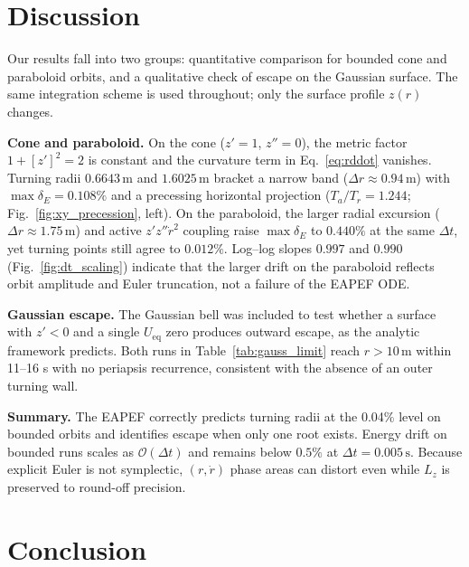 \documentclass[11pt,letterpaper]{article}
\newcommand{\parhead}[1]{\par\medskip\noindent\textbf{#1}\ignorespaces}
\begin{document}
\section{Discussion}
\label{sec:discussion}

Our results fall into two groups: quantitative comparison for bounded cone and paraboloid orbits, and a qualitative check of escape on the Gaussian surface. The same integration scheme is used throughout; only the surface profile $z(r)$ changes.

\parhead{Cone and paraboloid.}
On the cone ($z'=1$, $z''=0$), the metric factor $1+[z']^2=2$ is constant and the curvature term in Eq.~\eqref{eq:rddot} vanishes. Turning radii $0.6643\,\mathrm{m}$ and $1.6025\,\mathrm{m}$ bracket a narrow band ($\Delta r\approx 0.94\,\mathrm{m}$) with $\max\delta_E=0.108\%$ and a precessing horizontal projection ($T_a/T_r=1.244$; Fig.~\ref{fig:xy_precession}, left). On the paraboloid, the larger radial excursion ($\Delta r\approx 1.75\,\mathrm{m}$) and active $z'z''\dot{r}^2$ coupling raise $\max\delta_E$ to $0.440\%$ at the same $\Delta t$, yet turning points still agree to $0.012\%$. Log--log slopes $0.997$ and $0.990$ (Fig.~\ref{fig:dt_scaling}) indicate that the larger drift on the paraboloid reflects orbit amplitude and Euler truncation, not a failure of the EAPEF ODE.

\parhead{Gaussian escape.}
The Gaussian bell was included to test whether a surface with $z'<0$ and a single $U_{\mathrm{eq}}$ zero produces outward escape, as the analytic framework predicts. Both runs in Table~\ref{tab:gauss_limit} reach $r>10\,\mathrm{m}$ within 11--16 s with no periapsis recurrence, consistent with the absence of an outer turning wall.

\parhead{Summary.}
The EAPEF correctly predicts turning radii at the 0.04\% level on bounded orbits and identifies escape when only one root exists. Energy drift on bounded runs scales as $\mathcal{O}(\Delta t)$ and remains below $0.5\%$ at $\Delta t=0.005\,\mathrm{s}$. Because explicit Euler is not symplectic, $(r,\dot{r})$ phase areas can distort even while $L_z$ is preserved to round-off precision.

\section{Conclusion}
\label{sec:conclusion}
\end{document}
